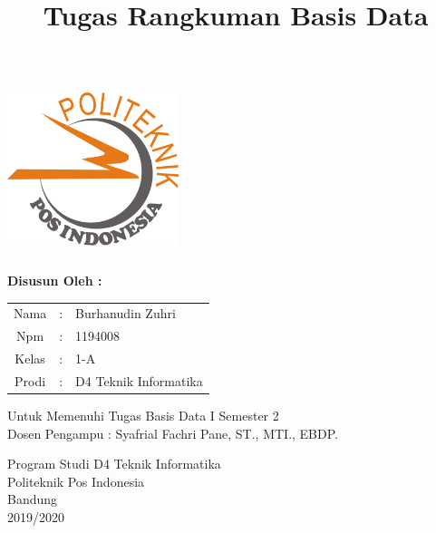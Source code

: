\documentclass[a4paper,12 pt]{article}
\title{\textbf{Tugas Rangkuman Basis Data}\linebreak}
\date{}
\begin{document}
	\maketitle
	\begin{center}
		\includegraphics[width=5cm,height=5cm]{logo.png}
	\end{center}
	\begin{center}
		\textbf{Disusun Oleh :} \linebreak
	\end{center}
	\vspace{0.5 cm}
	\begin{center}
		\begin{center}
			\begin{tabular}{c c l}
				
				
				Nama & : & Burhanudin Zuhri \\
				Npm & : & 1194008 \\
				Kelas & : & 1-A \\
				Prodi & : & D4 Teknik Informatika \\
			\end{tabular}
		\end{center}
		Untuk Memenuhi Tugas Basis Data I Semester 2 \\
		Dosen Pengampu : Syafrial Fachri Pane, ST., MTI., EBDP. 				\linebreak

		Program Studi D4 Teknik Informatika \\
		Politeknik Pos Indonesia\\
		Bandung\\
		2019/2020\linebreak
	\end{center}
	\newpage
\end{document}
